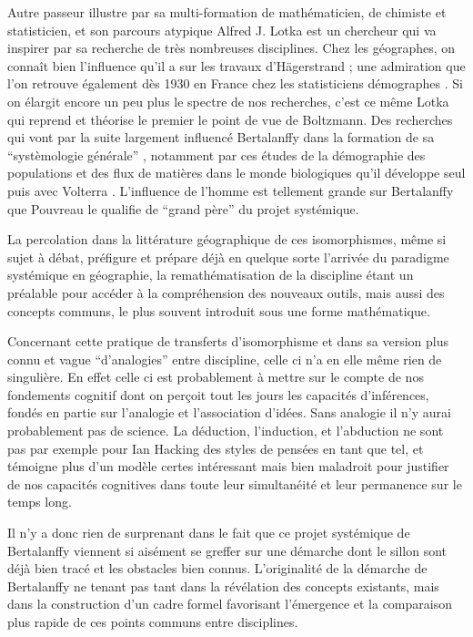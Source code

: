 Autre passeur illustre par sa multi-formation de mathématicien, de chimiste et statisticien, et son parcours atypique Alfred J. Lotka est un chercheur qui va inspirer par sa recherche de très nombreuses disciplines. Chez les géographes, on connaît bien l'influence qu'il a sur les travaux d'Hägerstrand \autocite[95]{Claval2007}; une admiration que l'on retrouve également dès 1930 en France chez les statisticiens démographes \autocite{Veron2009}. Si on élargit encore un peu plus le spectre de nos recherches, c'est ce même Lotka qui reprend et théorise le premier le point de vue de Boltzmann. Des recherches qui vont par la suite largement influencé Bertalanffy dans la formation de sa \enquote{systèmologie générale} \autocite[178]{Pouvreau2013}, notamment par ces études de la démographie des populations et des flux de matières dans le monde biologiques qu'il développe seul puis avec Volterra \autocite[545-546]{Pouvreau2013}. L'influence de l'homme est tellement grande sur Bertalanffy que Pouvreau le qualifie de \enquote{grand père} du projet systémique.

La percolation dans la littérature géographique de ces isomorphismes, même si sujet à débat, préfigure et prépare déjà en quelque sorte l'arrivée du paradigme systémique en géographie, la remathématisation de la discipline étant un préalable pour accéder à la compréhension des nouveaux outils, mais aussi des concepts communs, le plus souvent introduit sous une forme mathématique. \autocite[432]{Ackerman1963}

Concernant cette pratique de transferts d'isomorphisme et dans sa version plus connu et vague \enquote{d'analogies} entre discipline, celle ci n'a en elle même rien de singulière. En effet celle ci est probablement à mettre sur le compte de nos fondements cognitif dont on perçoit tout les jours les capacités d'inférences, fondés en partie sur l’analogie et l'association d'idées. Sans analogie il n'y aurai probablement pas de science. La déduction, l'induction, et l'abduction ne sont pas par exemple pour Ian Hacking des styles de pensées en tant que tel, et témoigne plus d'un modèle certes intéressant mais bien maladroit pour justifier de nos capacités cognitives dans toute leur simultanéité et leur permanence sur le temps long.

Il n'y a donc rien de surprenant dans le fait que ce projet systémique de Bertalanffy viennent si aisément se greffer sur une démarche dont le sillon sont déjà bien tracé et les obstacles bien connus. L'originalité de la démarche de Bertalanffy ne tenant pas tant dans la révélation des concepts existants, mais dans la construction d'un cadre formel favorisant l'émergence et la comparaison plus rapide de ces points communs entre disciplines. 

